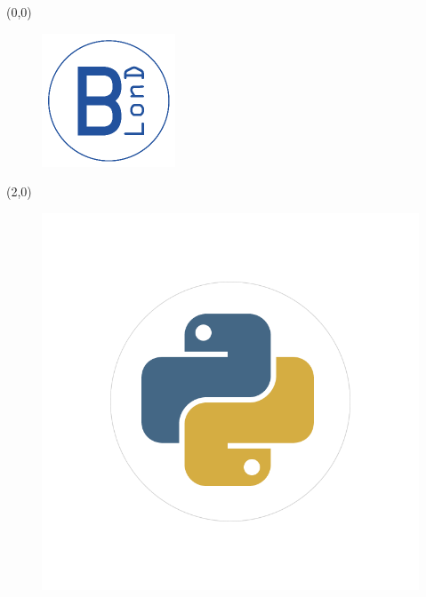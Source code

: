 \begin{frame}
	\begin{textblock}{2}(0,0)
		\begin{figure}
			\includegraphics[width=\textwidth]{figures/BLonD_logo_header}
		\end{figure}
	\end{textblock}
	\begin{textblock}{2}(2,0)
		\begin{figure}
			\includegraphics[width=\textwidth]{figures/python-logo}

\end{figure}
\end{textblock}
\end{frame}
